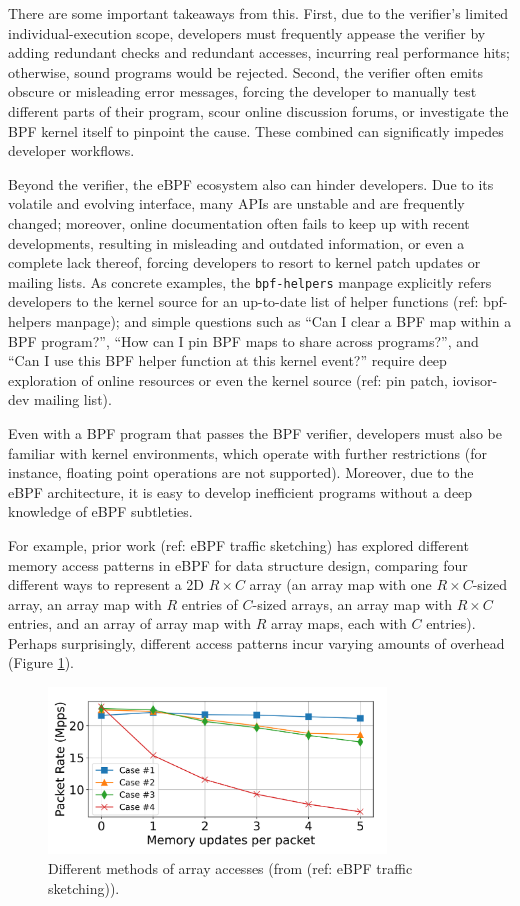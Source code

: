 There are some important takeaways from this. First, due to the verifier's limited
individual-execution scope, developers must frequently appease the verifier by adding redundant
checks and redundant accesses, incurring real performance hits; otherwise, sound programs would be
rejected. Second, the verifier often emits obscure or misleading error messages, forcing the
developer to manually test different parts of their program, scour online discussion forums, or
investigate the BPF kernel itself to pinpoint the cause. These combined can significatly impedes
developer workflows.

Beyond the verifier, the eBPF ecosystem also can hinder developers. Due to its volatile and evolving
interface, many APIs are unstable and are frequently changed; moreover, online documentation often
fails to keep up with recent developments, resulting in misleading and outdated information, or even
a complete lack thereof, forcing developers to resort to kernel patch updates or mailing lists. As
concrete examples, the \texttt{bpf-helpers} manpage explicitly refers developers to the kernel
source for an up-to-date list of helper functions (ref: bpf-helpers manpage); and simple questions
such as ``Can I clear a BPF map within a BPF program?'', ``How can I pin BPF maps to share across
programs?'', and ``Can I use this BPF helper function at this kernel event?'' require deep
exploration of online resources or even the kernel source (ref: pin patch, iovisor-dev mailing
list).

Even with a BPF program that passes the BPF verifier, developers must also be familiar with kernel
environments, which operate with further restrictions (for instance, floating point operations are
not supported). Moreover, due to the eBPF architecture, it is easy to develop inefficient programs
without a deep knowledge of eBPF subtleties.

For example, prior work (ref: eBPF traffic sketching) has explored different memory access patterns
in eBPF for data structure design, comparing four different ways to represent a 2D $R\times C$ array
(an array map with one $R\times C$-sized array, an array map with $R$ entries of $C$-sized arrays,
an array map with $R\times C$ entries, and an array of array map with $R$ array maps, each with $C$
entries). Perhaps surprisingly, different access patterns incur varying amounts of overhead (Figure
\ref{fig:array-access}).

\begin{figure}[htpb]
    \centering
    \includegraphics[width=0.8\textwidth]{diagrams/ebpf-array-accesses.png}
    \caption{Different methods of array accesses (from (ref: eBPF traffic sketching)).}
    \label{fig:array-access}
\end{figure}

